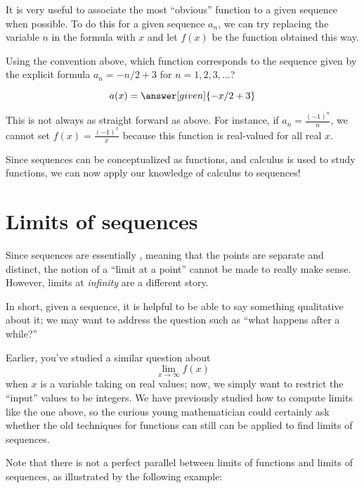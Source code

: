 \documentclass{ximera}
\begin{document}
It is very useful to associate the most ``obvious'' function to a given sequence when possible.  To do this for a given sequence $a_n$, we can try replacing the variable $n$ in the formula with $x$ and let $f(x)$ be the function obtained this way.

\begin{question}
  Using the convention above, which function corresponds to the sequence given by the explicit formula
  $a_n = -n/2+3$ for $n=1,2,3,\dots$?
  \begin{prompt}
    \[
    a(x) = \answer[given]{-x/2 + 3}
    \]
  \end{prompt}
\end{question}

\begin{warning}
This is not always as straight forward as above.  For instance, if $a_n = \frac{(-1)^n}{n}$, we cannot set $f(x) = \frac{(-1)^x}{x}$ because this function is real-valued for all real $x$.
\end{warning}

Since sequences can be conceptualized as functions, and calculus is
used to study functions, we can now apply our knowledge of calculus to
sequences!


\section{Limits of sequences}
Since sequences are essentially , meaning that the points
are separate and distinct, the notion of a ``limit at a point'' cannot
be made to really make sense. However, limits at \textit{infinity} are
a different story.

In short, given a sequence, it is helpful to be able to say something
qualitative about it; we may want to address the question such as
``what happens after a while?'' 

Earlier, you've studied a similar question about
\[
\lim_{x\to\infty} f(x)
\]
when $x$ is a variable taking on real values; now, we simply want to
restrict the ``input'' values to be integers.  We have previously studied how to compute limits like the one above, so the curious young mathematician could certainly ask whether the old techniques for functions can still can be applied to find limits of sequences.

Note that there is not a perfect parallel between limits of functions and limits of sequences, as illustrated by the following example:
\end{document}
